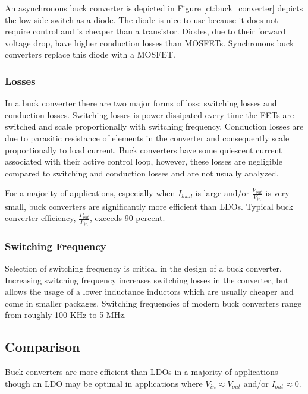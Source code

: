 \documentclass[main.tex]{subfiles}
\begin{document}
An asynchronous buck converter is depicted in Figure \ref{ct:buck_converter} depicts the low side switch as a diode. The diode is nice to use because it does not require control and is cheaper than a transistor. Diodes, due to their forward voltage drop, have higher conduction losses than MOSFETs. Synchronous buck converters replace this diode with a MOSFET. 


\subsubsection{Losses}
In a buck converter there are two major forms of loss: switching losses and conduction losses. Switching losses is power dissipated every time the FETs are switched and scale proportionally with switching frequency. Conduction losses are due to parasitic resistance of elements in the converter and consequently scale proportionally to load current. Buck converters have some quiescent current associated with their active control loop, however, these losses are negligible compared to switching and conduction losses and are not usually analyzed. 

For a majority of applications, especially when $I_{load}$ is large and/or $\frac{V_{out}}{V_{in}}$ is very small, buck converters are significantly more efficient than LDOs. Typical buck converter efficiency, $\frac{P_{out}}{P_{in}}$, exceeds 90 percent.  

\subsubsection{Switching Frequency}
Selection of switching frequency is critical in the design of a buck converter. Increasing switching frequency increases switching losses in the converter, but allows the usage of a lower inductance inductors which are usually cheaper and come in smaller packages. Switching frequencies of modern buck converters range from roughly 100 KHz to 5 MHz. 

\subsection{Comparison}
Buck converters are more efficient than LDOs in a majority of applications though an LDO may be optimal in applications where $V_{in} \approx V_{out}$ and/or $I_{out} \approx 0$. 
\end{document}
